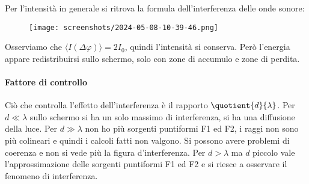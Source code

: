 Per l'intensità in generale si ritrova la formula dell'interferenza delle onde sonore:
\begin{figure}[H]
	\centering
	\texttt{[image: screenshots/2024-05-08-10-39-46.png]}
\end{figure}
Osserviamo che \(\langle I(\Delta \varphi ) \rangle = 2 I_0\), quindi l'intensità si conserva. Però l'energia appare redistribuirsi sullo schermo, solo con zone di accumulo e zone di perdita.

\paragraph{Fattore di controllo}
Ciò che controlla l'effetto dell'interferenza è il rapporto \(\quotient{d}{\lambda } \). Per \(d\ll \lambda \) sullo schermo si ha un solo massimo di interferenza, si ha una diffusione della luce. Per \(d \gg \lambda \) non ho più sorgenti puntiformi F1 ed F2, i raggi non sono più colineari e quindi i calcoli fatti non valgono. Si possono avere problemi di coerenza e non si vede più la figura d'interferenza. Per \(d>\lambda \) ma \(d\) piccolo vale l'approssimazione delle sorgenti puntiformi F1 ed F2 e si riesce a osservare il fenomeno di interferenza.

